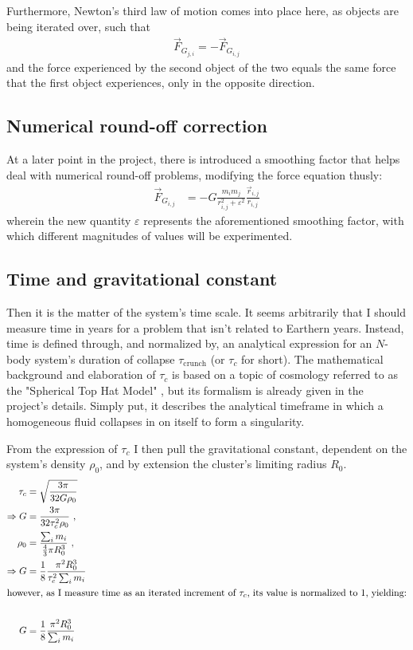 \documentclass[11pt,a4paper,notitlepage,twocolumn]{article}
\begin{document}
Furthermore, Newton's third law of motion comes into place here, as objects are being iterated over, such that
\begin{align}\label{eq:thirdlaw}
\vec{F}_{G_{j,i}} = -\vec{F}_{G_{i,j}}
\end{align}
and the force experienced by the second object of the two equals the same force that the first object experiences, only in the opposite direction.

\subsection{Numerical round-off correction}
At a later point in the project, there is introduced a smoothing factor that helps deal with numerical round-off problems, modifying the force equation thusly:
\begin{align}\label{eq:modgravlaw}
\vec{F}_{G_{i,j}} &= -G\frac{m_i m_j}{r^2_{i,j}+\varepsilon^2}\frac{\vec{r}_{i,j}}{r_{i,j}}
\end{align}
wherein the new quantity $\varepsilon$ represents the aforementioned smoothing factor, with which different magnitudes of values will be experimented.

\subsection{Time and gravitational constant}
Then it is the matter of the system's time scale. It seems arbitrarily that I should measure time in years for a problem that isn't related to Earthern years. Instead, time is defined through, and normalized by, an analytical expression for an $N$-body system's duration of collapse $\tau_{\text{crunch}}$ (or $\tau_c$ for short). The mathematical background and elaboration of $\tau_c$ is based on a topic of cosmology referred to as the "Spherical Top Hat Model" \cite{STHM}, but its formalism is already given in the project's details. Simply put, it describes the analytical timeframe in which a homogeneous fluid collapses in on itself to form a singularity.

From the expression of $\tau_c$ I then pull the gravitational constant, dependent on the system's density $\rho_0$, and by extension the cluster's limiting radius $R_0$.
\begin{align}\label{eq:tauc_and_G}
\tau_c &= \sqrt{\frac{3\pi}{32G\rho_0}} \nonumber \\
\Rightarrow G &= \frac{3\pi}{32\tau_c^2\rho_0}\ , \nonumber \\
\rho_0 &= \frac{\sum_{i} m_i}{\frac{4}{3}\pi R_0^3}\ , \nonumber \\
\Rightarrow G &= \frac{1}{8}\frac{\pi^2 R_0^3}{\tau_c^2 \sum_{i} m_i}\nonumber \\
\intertext{however, as I measure time as an iterated increment of $\tau_c$, its value is normalized to 1, yielding:}\nonumber \\
G &= \frac{1}{8}\frac{\pi^2 R_0^3}{\sum_{i} m_i}
\end{align}
\end{document}
